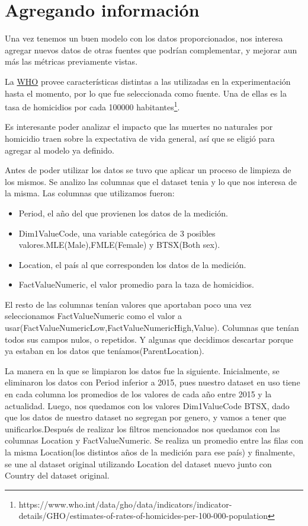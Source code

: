 \section{Agregando información}
Una vez tenemos un buen modelo con los datos proporcionados, nos interesa agregar nuevos datos de otras fuentes que podrían complementar, y mejorar aun más las métricas previamente vistas.

La \href{https://www.who.int/data/gho/data/themes/mortality-and-global-health-estimates}{WHO} provee características distintas a las utilizadas en la experimentación hasta el momento, por lo que fue seleccionada como fuente. Una de ellas es la tasa de homicidios por cada 100000 habitantes\footnote{https://www.who.int/data/gho/data/indicators/indicator-details/GHO/estimates-of-rates-of-homicides-per-100-000-population}.

Es interesante poder analizar el impacto que las muertes no naturales por homicidio traen sobre la expectativa de vida general, así que se eligió para agregar al modelo ya definido.

Antes de poder utilizar los datos se tuvo que aplicar un proceso de limpieza de los mismos. Se analizo las columnas que el dataset tenia y lo que nos interesa de la misma. Las columnas que utilizamos fueron:
\begin{itemize}
    \item Period, el año del que provienen los datos de la medición.
    \item Dim1ValueCode, una variable categórica de 3 posibles valores.MLE(Male),FMLE(Female) y BTSX(Both sex).
    \item Location, el país al que corresponden los datos de la medición.
    \item FactValueNumeric, el valor promedio para la taza de homicidios.
\end{itemize}

El resto de las columnas tenían valores que aportaban poco una vez seleccionamos FactValueNumeric como el valor a usar(FactValueNumericLow,FactValueNumericHigh,Value). Columnas que tenían todos sus campos nulos, o repetidos. Y algunas que decidimos descartar porque ya estaban en los datos que teníamos(ParentLocation).

La manera en la que se limpiaron los datos fue la siguiente. Inicialmente, se eliminaron los datos con Period inferior a 2015, pues nuestro dataset en uso tiene en cada columna los promedios de los valores de cada año entre 2015 y la actualidad. Luego, nos quedamos con los valores Dim1ValueCode BTSX, dado que los datos de nuestro dataset no segregan por genero, y vamos a tener que unificarlos.Después de realizar los filtros mencionados nos quedamos con las columnas Location y FactValueNumeric. Se realiza un promedio entre las filas con la misma Location(los distintos años de la medición para ese país) y finalmente, se une al dataset original utilizando Location del dataset nuevo junto con Country del dataset original.

